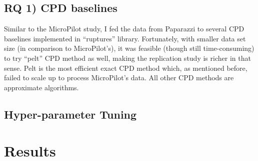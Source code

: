 \subsection{RQ 1) CPD baselines}
Similar to the MicroPilot study, I fed the data from Paparazzi to several CPD baselines implemented in ``ruptures'' library.
Fortunately, with smaller data set size (in comparison to MicroPilot's), it was feasible (though still time-consuming) to try ``pelt''\cite{killick2012optimal} CPD method as well, making the replication study is richer in that sense. Pelt is the most efficient exact CPD method which, as mentioned before, failed to scale up to process MicroPilot's data. All other CPD methods are approximate algorithms.

\subsection{Hyper-parameter Tuning}


\section{Results}

